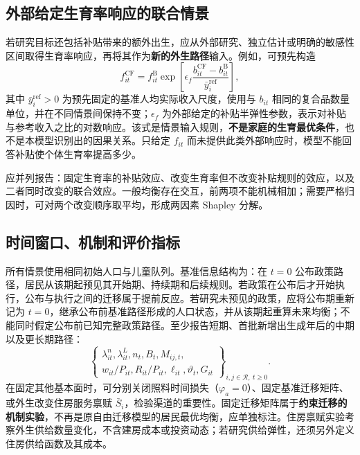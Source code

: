 \documentclass[UTF8,a4paper,zihao=-4,fontset=windows]{ctexart}
\numberwithin{equation}{section}
\newcommand{\B}{\mathrm B}
\newcommand{\CF}{\mathrm{CF}}
\begin{document}
\subsection{外部给定生育率响应的联合情景}
若研究目标还包括补贴带来的额外出生，应从外部研究、独立估计或明确的敏感性区间取得生育率响应，再将其作为\textbf{新的外生路径}输入。例如，可预先构造
\begin{equation}
  f^{\CF}_{it}
   =f^\B_{it}\exp\!\left[
      \epsilon_f\frac{b^{\CF}_{it}-b^\B_{it}}{\bar y_i^{\mathrm{ref}}}
      \right],
  \label{eq:external-fertility-response}
\end{equation}
其中 $\bar y_i^{\mathrm{ref}}>0$ 为预先固定的基准人均实际收入尺度，使用与 $b_{it}$ 相同的复合品数量单位，并在不同情景间保持不变；$\epsilon_f$ 为外部给定的补贴半弹性参数，表示对补贴与参考收入之比的对数响应。该式是情景输入规则，\textbf{不是家庭的生育最优条件}，也不是本模型识别出的因果关系。只给定 $f_{it}$ 而未提供此类外部响应时，模型不能回答补贴使个体生育率提高多少。

应并列报告：固定生育率的补贴效应、改变生育率但不改变补贴规则的效应，以及二者同时改变的联合效应。一般均衡存在交互，前两项不能机械相加；需要严格归因时，可对两个改变顺序取平均，形成两因素 Shapley 分解。

\subsection{时间窗口、机制和评价指标}
所有情景使用相同初始人口与儿童队列。基准信息结构为：在 $t=0$ 公布政策路径，居民从该期起预见其开始期、持续期和后续规则。若政策在公布后才开始执行，公布与执行之间的迁移属于提前反应。若研究未预见的政策，应将公布期重新记为 $t=0$，继承公布前基准路径形成的人口状态，并从该期起重算未来均衡；不能同时假定公布前已知完整政策路径。至少报告短期、首批新增出生成年后的中期以及更长期路径：
\begin{equation}
  \left\{\begin{gathered}
    \lambda^n_{it},\lambda^L_{it},n_t,B_t,M_{ij,t},\\
    w_{it}/P_{it},R_{it}/P_{it},\ell_{it},\vartheta_t,G_{it}
  \end{gathered}\right\}_{i,j\in\mathcal R,\ t\geq0}.
\end{equation}
在固定其他基本面时，可分别关闭照料时间损失（$\varphi_a=0$）、固定基准迁移矩阵、或外生改变住房服务禀赋 $\bar S_i$，检验渠道的重要性。固定迁移矩阵属于\textbf{约束迁移的机制实验}，不再是原自由迁移模型的居民最优均衡，应单独标注。住房禀赋实验考察外生供给数量变化，不含建房成本或投资动态；若研究供给弹性，还须另外定义住房供给函数及其成本。
\end{document}
